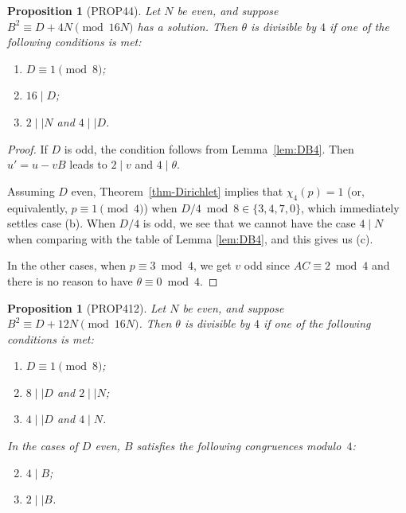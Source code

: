\documentclass[12pt,twoside,leqno]{article}
\newtheorem{proposition}[theorem]{Proposition}
\numberwithin{equation}{section}
\newenvironment {alphenumerate}
   {\renewcommand {\labelenumi}{(\alph {enumi})}
    \renewcommand {\labelenumii}{(\alph {enumi}\arabic {enumii})}
    \begin {enumerate}}
   {\end {enumerate}}
\begin{document}
\begin{proposition}[PROP44]\label{prop:44}
Let $N$ be even, and suppose $B^2 \equiv D + 4 N \pmod {16 N}$ has a solution.
Then $\theta$ is divisible by $4$
if one of the following conditions is met:
\begin {alphenumerate}
\item
$D \equiv 1 \pmod 8$;
\item
$16\mid D$;
\item
$2\mid\mid N$ and $4\mid\mid D$.
\end {alphenumerate}
\end{proposition}

\begin{proof}
If $D$ is odd, the condition follows from Lemma~\ref{lem:DB4}.
Then $u' = u - v B$ leads to $2\mid v$ and $4 \mid \theta$.

Assuming $D$ even, Theorem~\ref{thm-Dirichlet} implies that
$\chi_4(p) = 1$ (or, equivalently, $p\equiv 1\pmod 4$) when $D/4 \bmod 8
\in \{3, 4, 7, 0\}$, which
immediately settles case (b). When $D/4$ is odd, we see that we cannot
have the case $4\mid N$ when comparing with the table of Lemma
\ref{lem:DB4}, and this gives us (c).

In the other cases, when $p\equiv 3\bmod 4$, we get $v$ odd since
$AC\equiv 2\bmod 4$ and there is no reason to have $\theta\equiv
0\bmod 4$.
\end{proof}

\begin{proposition}[PROP412]\label{prop:412}
Let $N$ be even, and suppose $B^2 \equiv D + 12 N \pmod {16 N}$.
Then $\theta$ is divisible by $4$
if one of the following conditions is met:
\begin {alphenumerate}
\item
$D \equiv 1 \pmod 8$;
\item
$8 \mid\mid D$ and $2 \mid\mid N$;
\item
$4 \mid\mid D$ and $4 \mid N$.
\end {alphenumerate}
In the cases of $D$ even, $B$ satisfies the following congruences modulo~$4$:
\begin {alphenumerate}
\setcounter {enumi}{1}
\item
$4 \mid B$;
\item
$2 \mid\mid B$.
\end {alphenumerate}
\end{proposition}
\end{document}
